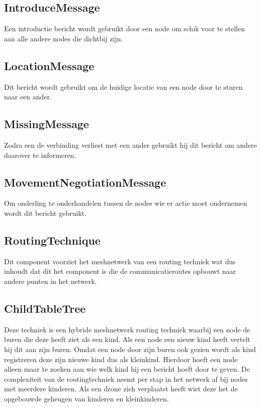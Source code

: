 \documentclass[a4paper, 11pt, oneside]{report}
\begin{document}
\subsection{IntroduceMessage}
\label{architectural:subcomponenten:IntroduceMessage}
Een introductie bericht wordt gebruikt door een node om schik voor te stellen aan alle andere nodes die dichtbij zijn. 

\subsection{LocationMessage}
\label{architectural:subcomponenten:LocationMessage}
Dit bericht wordt gebruikt om de huidige locatie van een node door te sturen naar een ander.

\subsection{MissingMessage}
\label{architectural:subcomponenten:MissingMessage}
Zodra een  de verbinding verliest met een ander gebruikt hij dit bericht om andere daarover te informeren.

\subsection{MovementNegotiationMessage}	
\label{architectural:subcomponenten:MovementNegotiationMessage}
Om onderling te onderhandelen tussen de nodes wie er actie moet ondernemen wordt dit bericht gebruikt.

\subsection{RoutingTechnique}
\label{architectural:subcomponenten:RoutingTechnique}
Dit component voorziet het meshnetwerk van een routing techniek wat dus inhoudt dat dit het component is die de communicatieroutes opbouwt naar andere punten in het netwerk.
  
\subsection{ChildTableTree}
\label{architectural:subcomponenten:ChildTableTree}
Deze techniek is een hybride meshnetwerk routing techniek waarbij een node de buren die deze heeft ziet als een kind.
Als een node een nieuw kind heeft vertelt hij dit aan zijn buren.
Omdat een node door zijn buren ook gezien wordt als kind registreren deze zijn nieuwe kind dus als kleinkind.
Hierdoor hoeft een node alleen maar te zoeken aan wie welk kind hij een bericht hoeft door te geven. 
De complexiteit van de routingtechniek neemt per stap in het netwerk af bij nodes met meerdere kinderen.
Als een drone zich verplaatst heeft wist deze het de opgebouwde geheugen van kinderen en kleinkinderen. 
\end{document}
